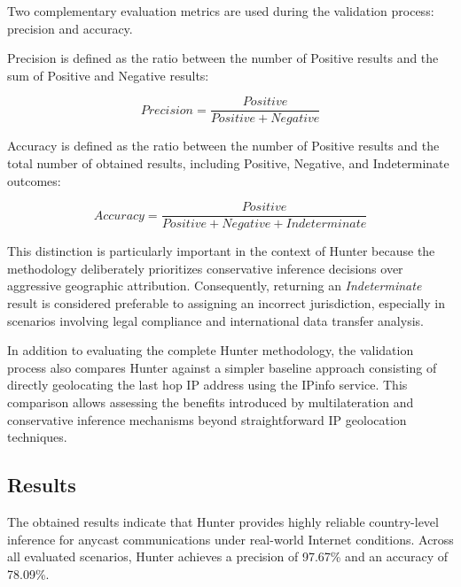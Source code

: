 Two complementary evaluation metrics are used during the validation process: precision and accuracy.

Precision is defined as the ratio between the number of Positive results and the sum of Positive and Negative results:

\begin{equation*}
    Precision = \frac{Positive}{Positive + Negative}
\end{equation*}

Accuracy is defined as the ratio between the number of Positive results and the total number of obtained results, including Positive, Negative, and Indeterminate outcomes:

\begin{equation*}
    Accuracy = \frac{Positive}{Positive + Negative + Indeterminate}
\end{equation*}

This distinction is particularly important in the context of Hunter because the methodology deliberately prioritizes conservative inference decisions over aggressive geographic attribution. Consequently, returning an \textit{Indeterminate} result is considered preferable to assigning an incorrect jurisdiction, especially in scenarios involving legal compliance and international data transfer analysis.

In addition to evaluating the complete Hunter methodology, the validation process also compares Hunter against a simpler baseline approach consisting of directly geolocating the last hop IP address using the IPinfo service. This comparison allows assessing the benefits introduced by multilateration and conservative inference mechanisms beyond straightforward IP geolocation techniques.

\subsection{Results}


The obtained results indicate that Hunter provides highly reliable country-level inference for anycast communications under real-world Internet conditions. Across all evaluated scenarios, Hunter achieves a precision of 97.67\% and an accuracy of 78.09\%.


